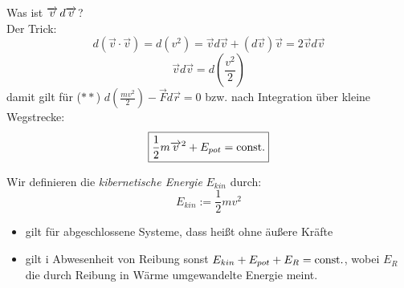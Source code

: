 \documentclass[a4paper,10pt]{scrartcl}
\begin{document}
Was ist $\overrightarrow{v} \, d\overrightarrow{v}$?\\
Der Trick:
\[
 d(\vec v \cdot \vec v)=d(v^2)=\vec v d\vec v+(d\vec v)\vec v=2\vec v d\vec v
\]
\[
 \vec v d\vec v=d(\frac{v^2}{2})
\]
 damit gilt für ($**$) $d(\frac{mv^2}{2})-\vec F d\vec r=0$
bzw. nach Integration über kleine Wegstrecke:
  \[
   \boxed{\frac{1}{2}m\overrightarrow{v}^2+E_{pot}=\text{const}.}
  \]
\begin{note*}
 Wir definieren die \emph{kibernetische Energie} $E_{kin}$ durch:
\[
 E_{kin}:=\frac{1}{2}mv^2
\]
 \begin{itemize}
  \item gilt für abgeschlossene Systeme, dass heißt ohne äußere Kräfte
  \item gilt i Abwesenheit von Reibung sonst $E_{kin}+E_{pot}+E_R=\text{const}.$, wobei $E_R$ die durch Reibung in Wärme umgewandelte Energie meint.
 \end{itemize}
\end{note*}
\end{document}
